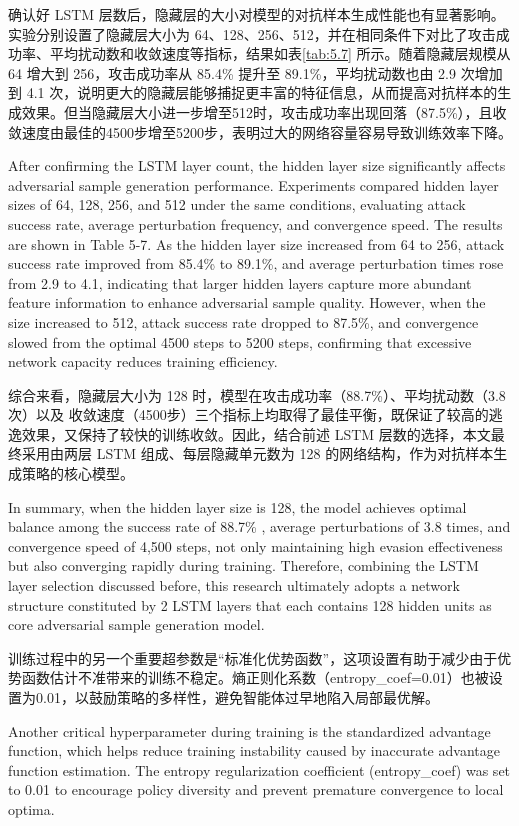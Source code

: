 确认好 LSTM 层数后，隐藏层的大小对模型的对抗样本生成性能也有显著影响。实验分别设置了隐藏层大小为 64、128、256、512，并在相同条件下对比了攻击成功率、平均扰动数和收敛速度等指标，结果如表\ref{tab:5.7} 所示。随着隐藏层规模从 64 增大到 256，攻击成功率从 85.4\% 提升至 89.1\%，平均扰动数也由 2.9 次增加到 4.1 次，说明更大的隐藏层能够捕捉更丰富的特征信息，从而提高对抗样本的生成效果。但当隐藏层大小进一步增至512时，攻击成功率出现回落（87.5\%），且收敛速度由最佳的4500步增至5200步，表明过大的网络容量容易导致训练效率下降。

After confirming the LSTM layer count, the hidden layer size significantly affects adversarial sample generation performance. Experiments compared hidden layer sizes of 64, 128, 256, and 512 under the same conditions, evaluating attack success rate, average perturbation frequency, and convergence speed. The results are shown in Table 5-7. As the hidden layer size increased from 64 to 256, attack success rate improved from 85.4\% to 89.1\%, and average perturbation times rose from 2.9 to 4.1, indicating that larger hidden layers capture more abundant feature information to enhance adversarial sample quality. However, when the size increased to 512, attack success rate dropped to 87.5\%, and convergence slowed from the optimal 4500 steps to 5200 steps, confirming that excessive network capacity reduces training efficiency.

综合来看，隐藏层大小为 128 时，模型在攻击成功率（88.7\%）、平均扰动数（3.8次）以及 收敛速度（4500步）三个指标上均取得了最佳平衡，既保证了较高的逃逸效果，又保持了较快的训练收敛。因此，结合前述 LSTM 层数的选择，本文最终采用由两层 LSTM 组成、每层隐藏单元数为 128 的网络结构，作为对抗样本生成策略的核心模型。

In summary, when the hidden layer size is 128, the model achieves optimal balance among the success rate of 88.7\% , average perturbations of 3.8 times, and convergence speed of 4,500 steps, not only maintaining high evasion effectiveness but also converging rapidly during training. Therefore, combining the LSTM layer selection discussed before, this research ultimately adopts a network structure constituted by 2 LSTM layers that each contains 
128 hidden units as core adversarial sample generation model.

训练过程中的另一个重要超参数是“标准化优势函数”，这项设置有助于减少由于优势函数估计不准带来的训练不稳定。熵正则化系数（entropy\_coef=0.01）也被设置为0.01，以鼓励策略的多样性，避免智能体过早地陷入局部最优解。

Another critical hyperparameter during training is the standardized advantage function, which helps reduce training instability caused by inaccurate advantage function estimation. The entropy regularization coefficient (entropy\_coef) was set to 0.01 to encourage policy diversity and prevent premature convergence to local optima.

